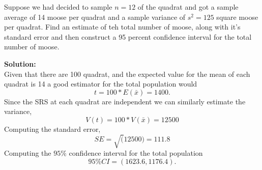 \documentclass[12pt]{article}
\makeatletter
\theoremstyle{homework}
\newenvironment{exercise}[1]
{\def\@currentlabel{#1}\exercisecore}
{\endexercisecore}
\newcommand{\localhead}[1]{\par\smallskip\noindent\textbf{#1}\nobreak\\}%
\newcommand\solution{\localhead{Solution:}}
\makeatother
\begin{document}
\begin{exercise}{4} Suppose we had decided to sample $n = 12$ of the quadrat and got a sample average of 
    14 moose per quadrat and a sample variance of $s^2 = 125$ square moose per quadrat. Find an estimate of teh total
    number of moose, along with it's standard error and then construct a 95 percent confidence interval for the total number of moose. \\
    \solution Given that there are 100 quadrat, and the expected value for the mean of each quadrat is 14 a good estimator for the total population would
        \begin{equation*}
            t = 100*E(\bar{x}) = 1400.
        \end{equation*}
    Since the SRS at each quadrat are independent we can similarly estimate the variance, 
        \begin{equation*}
            V(t) = 100*V(\bar{x}) = 12500
        \end{equation*}
    Computing the standard error, 
    \begin{equation*}
        SE = \sqrt(12500) = 111.8
    \end{equation*}
    Computing the $95\%$ confidence interval for the total population
    \begin{equation*}
        95\% CI = (1623.6, 1176.4).
    \end{equation*}
\end{exercise}
\vspace{1in}
\end{document}
